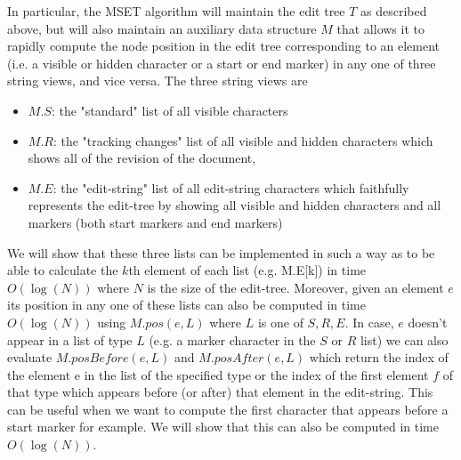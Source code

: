 \documentclass{amsart}
\begin{document}
In particular, the MSET algorithm will maintain the edit tree $T$ as described above,
but will also maintain an auxiliary data structure $M$ that allows it to rapidly
compute the node position in the edit tree corresponding to an element (i.e. a visible or hidden character or a start or end marker) in any one
of three string views, and vice versa. The three string views are
\begin{itemize}
\item $M.S$: the "standard" list of all visible characters
\item $M.R$: the "tracking changes" list of all visible and hidden characters which shows all of the revision of the document,
\item $M.E$: the "edit-string" list of all edit-string characters which faithfully represents the edit-tree by showing all visible and hidden characters and all markers (both
start markers and end markers)
\end{itemize}
We will show that these three lists can be implemented in such a way as to be able
to calculate the $k$th element of each list (e.g. M.E[k]) in time $O(\log(N))$ where $N$ is the size of the edit-tree. Moreover, given an element $e$ its position in any one of these lists can also be computed in time $O(\log(N))$ using $M.pos(e,L)$ where $L$ is one of $S,R,E$.  In case, $e$ doesn't appear in a list of type $L$ (e.g. a marker character in the $S$ or $R$ list) we can also evaluate $M.posBefore(e,L)$ and $M.posAfter(e,L)$ which return the index of the element e in the list of the specified type or the index of the first element $f$ of that type which appears before (or after) that element in the edit-string. This can be useful when we want to compute the first character that appears before a start marker for example. We will show that this can also be computed in time $O(\log(N))$. 
\end{document}
